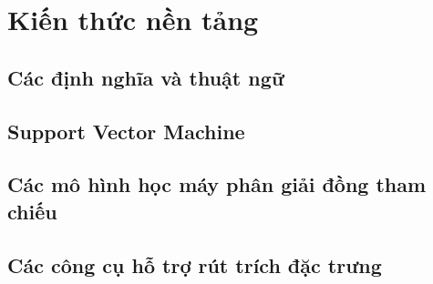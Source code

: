 \chapter{Kiến thức nền tảng}
\section{Các định nghĩa và thuật ngữ}
\section{Support Vector Machine}
\section{Các mô hình học máy phân giải đồng tham chiếu}
\section{Các công cụ hỗ trợ rút trích đặc trưng} \label{tools}
